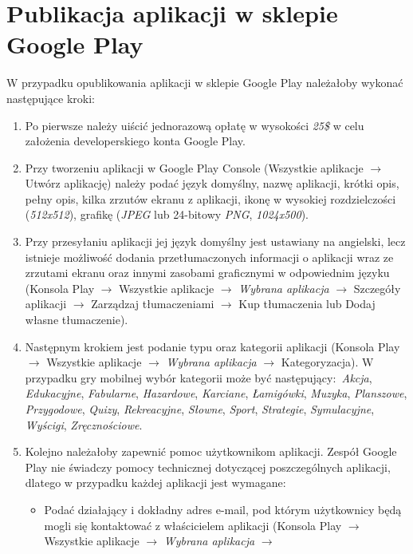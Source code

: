 \documentclass[12pt, a4paper]{article}
\begin{document}
\section{Publikacja aplikacji w sklepie Google Play}
W przypadku opublikowania aplikacji w sklepie Google Play należałoby wykonać 
następujące kroki:
\begin{enumerate}
\item Po pierwsze należy uiścić jednorazową opłatę w wysokości \textit{25\$} 
w celu założenia developerskiego konta Google Play.
\item Przy tworzeniu aplikacji w Google Play Console (Wszystkie aplikacje $
\rightarrow$ Utwórz aplikację) należy podać język domyślny, nazwę aplikacji, 
krótki opis, pełny opis, kilka zrzutów ekranu z aplikacji, ikonę w wysokiej 
rozdzielczości (\textit{512x512}), grafikę (\textit{JPEG} lub 24-bitowy 
\textit{PNG}, \textit{1024x500}). 
\item Przy przesyłaniu aplikacji jej język domyślny jest ustawiany na 
angielski, lecz istnieje możliwość dodania przetłumaczonych informacji o 
aplikacji wraz ze zrzutami ekranu oraz innymi zasobami graficznymi w 
odpowiednim języku (Konsola Play $\rightarrow$ Wszystkie aplikacje $
\rightarrow$ \textit{Wybrana aplikacja} $\rightarrow$ Szczegóły aplikacji $
\rightarrow$ Zarządzaj tłumaczeniami $\rightarrow$ Kup tłumaczenia lub Dodaj 
własne tłumaczenie).
\item Następnym krokiem jest podanie typu oraz kategorii aplikacji (Konsola 
Play $\rightarrow$ Wszystkie aplikacje $\rightarrow$ \textit{Wybrana 
aplikacja} $\rightarrow$ Kategoryzacja). W przypadku gry mobilnej wybór 
kategorii może być następujący$\colon$ \textsl{Akcja}, \textsl{Edukacyjne}, 
\textsl{Fabularne}, \textsl{Hazardowe}, \textsl{Karciane}, 
\textsl{Łamigówki}, \textsl{Muzyka}, \textsl{Planszowe}, \textsl{Przygodowe}, 
\textsl{Quizy}, \textsl{Rekreacyjne}, \textsl{Słowne}, \textsl{Sport}, 
\textsl{Strategie}, \textsl{Symulacyjne}, \textsl{Wyścigi}, 
\textsl{Zręcznościowe}.
\item Kolejno należałoby zapewnić pomoc użytkownikom aplikacji. Zespół Google 
Play nie świadczy pomocy technicznej dotyczącej poszczególnych aplikacji, 
dlatego w przypadku każdej aplikacji jest wymagane$\colon$
\begin{itemize}
\item Podać działający i dokładny adres e-mail, pod którym użytkownicy będą 
mogli się kontaktować z właścicielem aplikacji (Konsola Play $\rightarrow$ 
Wszystkie aplikacje $\rightarrow$ \textit{Wybrana aplikacja} $\rightarrow$ 

\end{itemize}
\end{enumerate}
\end{document}
